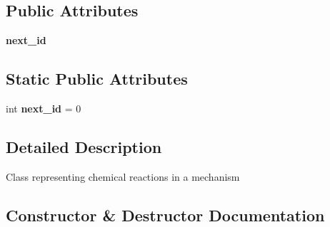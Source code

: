 \subsection*{Public Attributes}
\begin{DoxyCompactItemize}
\item 
{\bfseries next\+\_\+id}\hypertarget{classpecans_1_1mechgen_1_1Reaction_a8d26627bd95499217692f691c2ec3d42}{}\label{classpecans_1_1mechgen_1_1Reaction_a8d26627bd95499217692f691c2ec3d42}

\end{DoxyCompactItemize}
\subsection*{Static Public Attributes}
\begin{DoxyCompactItemize}
\item 
int {\bfseries next\+\_\+id} = 0\hypertarget{classpecans_1_1mechgen_1_1Reaction_a86b4bbe81c34b5a34ab1c8ab660d8bfa}{}\label{classpecans_1_1mechgen_1_1Reaction_a86b4bbe81c34b5a34ab1c8ab660d8bfa}

\end{DoxyCompactItemize}


\subsection{Detailed Description}
\begin{DoxyVerb}Class representing chemical reactions in a mechanism
\end{DoxyVerb}
 

\subsection{Constructor \& Destructor Documentation}
